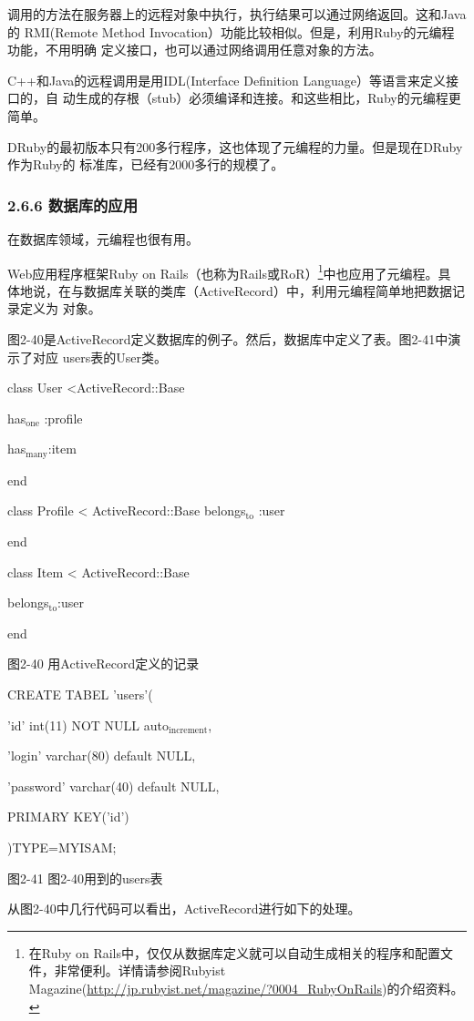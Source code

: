 \documentclass[11pt]{ctexart}
\begin{document}
调用的方法在服务器上的远程对象中执行，执行结果可以通过网络返回。这和Java的
RMI(Remote Method Invocation）功能比较相似。但是，利用Ruby的元编程功能，不用明确
定义接口，也可以通过网络调用任意对象的方法。

C++和Java的远程调用是用IDL(Interface Definition Language）等语言来定义接口的，自
动生成的存根（stub）必须编译和连接。和这些相比，Ruby的元编程更简单。

DRuby的最初版本只有200多行程序，这也体现了元编程的力量。但是现在DRuby作为Ruby的
标准库，已经有2000多行的规模了。
\subsubsection{2.6.6 数据库的应用}
\label{sec:org1e289e4}

在数据库领域，元编程也很有用。

Web应用程序框架Ruby on Rails（也称为Rails或RoR）\footnote{在Ruby on Rails中，仅仅从数据库定义就可以自动生成相关的程序和配置文
件，非常便利。详情请参阅Rubyist
Magazine(\url{http://jp.rubyist.net/magazine/?0004\_RubyOnRails})的介绍资料。}中也应用了元编程。具
体地说，在与数据库关联的类库（ActiveRecord）中，利用元编程简单地把数据记录定义为
对象。

图2-40是ActiveRecord定义数据库的例子。然后，数据库中定义了表。图2-41中演示了对应
users表的User类。

class User <ActiveRecord::Base

has\(_{\text{one}}\) :profile

has\(_{\text{many}}\):item

end

class Profile < ActiveRecord::Base
   belongs\(_{\text{to}}\) :user

end

class Item < ActiveRecord::Base

belongs\(_{\text{to}}\):user

end

图2-40 用ActiveRecord定义的记录

CREATE TABEL 'users'(

'id' int(11) NOT NULL auto\(_{\text{increment}}\),

'login' varchar(80) default NULL,

'password' varchar(40) default NULL,

PRIMARY KEY('id')

)TYPE=MYISAM;

图2-41 图2-40用到的users表

从图2-40中几行代码可以看出，ActiveRecord进行如下的处理。
\end{document}
